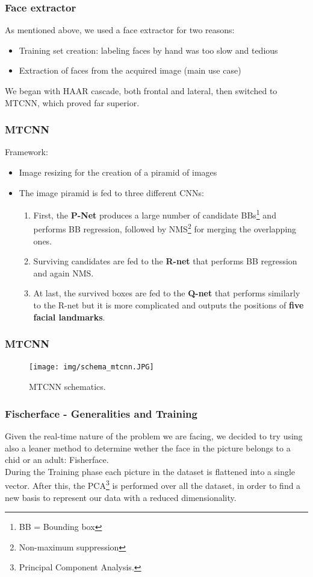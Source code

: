 \documentclass{beamer}
\begin{document}
	\begin{frame}
		\frametitle{Face extractor}
		As mentioned above, we used a face extractor for two reasons:
		\begin{itemize}
			\item Training set creation: labeling faces by hand was too slow and tedious
			\item Extraction of faces from the acquired image (main use case)
		\end{itemize}
		We began with HAAR cascade, both frontal and lateral, then switched to MTCNN, which proved far superior.
	\end{frame}
	
	\begin{frame}
		\frametitle{MTCNN}
		Framework:
		\begin{itemize}
			\item Image resizing for the creation of a piramid of images
			\item The image piramid is fed to three different CNNs:
			\begin{enumerate}
				\item First, the \textbf{P-Net} produces a large number of candidate BBs\footnote{BB = Bounding box} and performs BB regression, followed by NMS\footnote{Non-maximum suppression} for merging the overlapping ones.
				\item Surviving candidates are fed to the \textbf{R-net} that performs BB regression and again NMS.
				\item At last, the survived boxes are fed to the \textbf{Q-net} that performs similarly to the R-net but it is more complicated and outputs the positions of \textbf{five facial landmarks}.
			\end{enumerate}
		\end{itemize}
	\end{frame}
	
	\begin{frame}
		\frametitle{MTCNN}
		\begin{figure}
			\centering
			\texttt{[image: img/schema\_mtcnn.JPG]}
    		\caption{MTCNN schematics.}
    		\label{fig:schema_mtcnn}
		\end{figure}
	\end{frame}
	
	\begin{frame}
		\frametitle{Fischerface - Generalities and Training}
		Given the real-time nature of the problem we are facing, we decided to try using also a leaner method to determine wether the face in the picture belongs to a chid or an adult: Fisherface.\\ \bigskip
		During the Training phase each picture in the dataset is flattened into a single vector. After this, the PCA\footnote{Principal Component Analysis.} is performed over all the dataset, in order to find a new basis to represent our data with a reduced dimensionality\footfullcite{Belhumeur1997}.
		 
	\end{frame}
	
\end{document}
